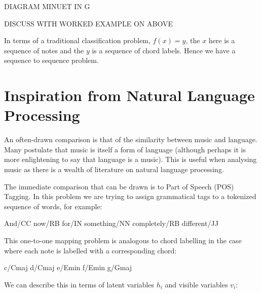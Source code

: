 \documentclass[bsc,singlespacing,logo, parskip, deptreport]{infthesis}
\begin{document}
DIAGRAM MINUET IN G

DISCUSS WITH WORKED EXAMPLE ON ABOVE

In terms of a traditional classification problem, $f(x) = y$, the $x$ here is a sequence of notes and the $y$ is a sequence of chord labels. Hence we have a sequence to sequence problem.

\section{Inspiration from Natural Language Processing}

An often-drawn comparison is that of the similarity between music and language. Many postulate that music is itself a form of language \cite{cohen2008music} (although perhaps it is more enlightening to say that language is a music). This is useful when analysing music as there is a wealth of literature on natural language processing.

The immediate comparison that can be drawn is to Part of Speech (POS) Tagging. In this problem we are trying to assign grammatical tags to a tokenized sequence of words, for example:

And/CC now/RB for/IN something/NN completely/RB different/JJ

This one-to-one mapping problem is analogous to chord labelling in the case where each note is labelled with a corresponding chord:

c/Cmaj d/Cmaj e/Emin f/Emin g/Gmaj

We can describe this in terms of latent variables $h_i$ and visible variables $v_i$:

\begin{center}
\end{center}
\end{document}
